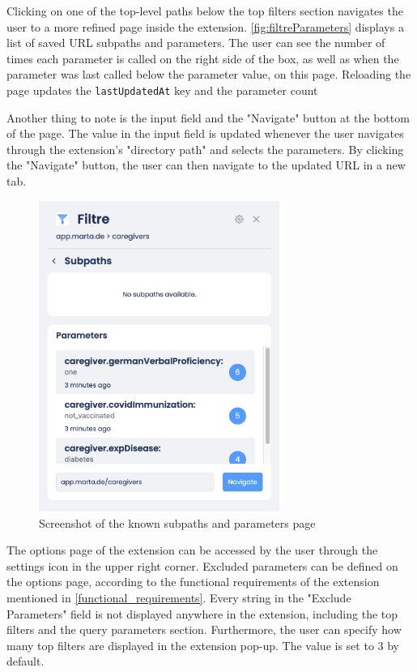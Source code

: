 Clicking on one of the top-level paths below the top filters section navigates the user to a more refined page inside the extension. \autoref{fig:filtreParameters} displays a list of saved URL subpaths and parameters. The user can see the number of times each parameter is called on the right side of the box, as well as when the parameter was last called below the parameter value, on this page. Reloading the page updates the \texttt{lastUpdatedAt} key and the parameter count

Another thing to note is the input field and the "Navigate" button at the bottom of the page. The value in the input field is updated whenever the user navigates through the extension's "directory path" and selects the parameters. By clicking the "Navigate" button, the user can then navigate to the updated URL in a new tab.

\begin{figure}[H]
  \centering
  \includegraphics[width=0.7\textwidth]{assets/screenshot_filtre_parameters.png}
  \caption{Screenshot of the known subpaths and parameters page}
  \label{fig:filtreParameters}
\end{figure}

The options page of the extension can be accessed by the user through the settings icon in the upper right corner. Excluded parameters can be defined on the options page, according to the functional requirements of the extension mentioned in \autoref{functional_requirements}. Every string in the "Exclude Parameters" field is not displayed anywhere in the extension, including the top filters and the query parameters section. Furthermore, the user can specify how many top filters are displayed in the extension pop-up. The value is set to 3 by default.

